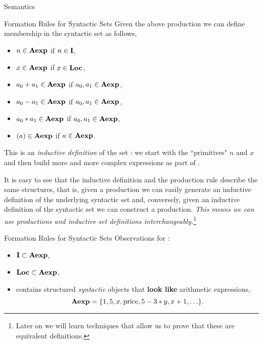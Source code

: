 \documentclass{beamer}
\begin{document}
\begin{frame}{Semantics}
\begin{frame}{Formation Rules for Syntactic Sets}
\vspace{.1in}
Given the above production we can define membership in the syntactic set as follows,
\begin{minipage}[t]{2in}
\begin{itemize}
\item $n \in  \mbox{\bf Aexp}$ if $n \in \mbox{\bf I}$,
\item $x \in \mbox{\bf Aexp}$ if $x\in \mbox{\bf Loc}$,
\item $a_0 + a_1 \in \mbox{\bf Aexp}$ if $a_0, a_1 \in \mbox{\bf Aexp}$,
\end{itemize}
\end{minipage}
\begin{minipage}[t]{2in}
\begin{itemize}
\item $a_0 - a_1 \in \mbox{\bf Aexp}$ if $a_0, a_1 \in \mbox{\bf Aexp}$,
\item $a_0 * a_1 \in \mbox{\bf Aexp}$ if $a_0, a_1 \in \mbox{\bf Aexp}$,
\item $( a )\in \mbox{\bf Aexp}$ if $a \in \mbox{\bf Aexp}$.
\end{itemize}
\end{minipage}

\vspace{.1in}

This is an {\em inductive definition} of the set : we start with the ``primitives" $n$ and
$x$ and then build more and more complex expressions as part of .

\vspace{.1in}

It is easy to see that the inductive definition and the production rule describe the same structures, that is,
given a production we can easily generate an inductive definition of the underlying syntactic set and, conversely, given an inductive definition of the syntactic set we can construct a production.
{\em This means we can use productions and inductive set definitions interchangeably.}\footnote{\tiny Later on we will learn techniques that allow us to prove that these are equivalent definitions.}

\end{frame}


\begin{frame}{Formation Rules for Syntactic Sets}
Observations for :
\begin{itemize}
\item $\mbox{\bf I} \subset \mbox{\bf Aexp}$,
\item $\mbox{\bf Loc} \subset \mbox{\bf Aexp}$,
\item contains structured {\em syntactic} objects that {\bf look like} arithmetic expressions,
\[
\mbox{\bf Aexp} = \{1,5,x,\mbox{price},5-3*y,x+1,\ldots\}.
\]
\end{itemize}
\end{frame}


\end{frame}
\end{document}
